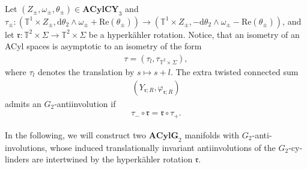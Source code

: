 \documentclass[psamsfonts]{amsart}
\theoremstyle{plain}
\theoremstyle{definition}{
\newtheorem{defi}{Definition}[section]
\newtheorem{ass}{Assumption}
\newtheorem*{nota}{Notation}}
\theoremstyle{remark}{
\newtheorem{rem}{Remark}
\newtheorem{ex}{Example}}
\theoremstyle{plain}{
\newtheorem{thm}{Theorem}[section]
\newtheorem{lem}{Lemma}[section]
\newtheorem{cor}{Corollary}[section]
\newtheorem{prop}{Proposition}[section]
\newtheorem{con}{Conjecture}[section]}
\newcommand{\m}[1]{{\mathrm{#1}}}
\newcommand{\cat}[1]{\textbf{#1}}
\begin{document}
    Let $(Z_\pm,\omega_\pm,\theta_\pm)\in\cat{ACylCY}_3$ and $\tau_\pm\colon (\mathbb{T}^1\times  Z_\pm,\m{d}\theta_2\wedge\omega_\pm+\m{Re}(\theta_\pm))\rightarrow (\mathbb{T}^1\times  Z_\pm,-\m{d}\theta_2\wedge\omega_\pm-\m{Re}(\theta_\pm))$, and let $\mathfrak{r} \colon\mathbb{T}^2\times\Sigma\rightarrow \mathbb{T}^2\times \Sigma$ be a hyperkähler rotation.
    Notice, that an isometry of an ACyl spaces is asymptotic to an isometry of the form 
    \begin{align*}
        \tau=(\tau_l,\tau_{\mathbb{T}^2\times \Sigma}),
    \end{align*}
    where $\tau_l$ denotes the translation by $s\mapsto s+l$. The extra twisted connected sum 
    \begin{align*}
        (Y_{\mathfrak{r};R},\varphi_{\mathfrak{r};R})
    \end{align*}
    admits an $G_2$-antiinvolution if 
    \begin{align*}
        \tau_-\circ\mathfrak{r}=\mathfrak{r}\circ\tau_+.
    \end{align*}

In the following, we will construct two $\cat{ACylG}_2$ manifolds with $G_2$-anti-involutions, whose induced translationally invariant antiinvolutions of the $G_2$-cy-linders are intertwined by the hyperkähler rotation $\mathfrak{r}$.
\end{document}
